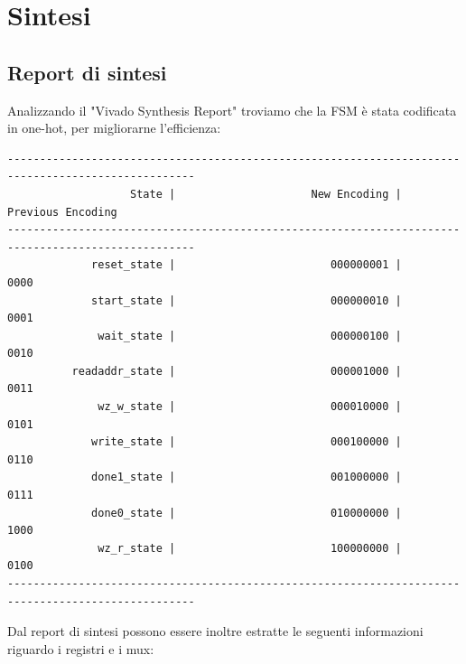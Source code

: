 \documentclass{article}
\begin{document}
\vspace{4mm}
\titlerule[0.4pt]


\pagebreak
\section{Sintesi}
\subsection{Report di sintesi}
Analizzando il "Vivado Synthesis Report" troviamo che la FSM è stata codificata in one-hot, per migliorarne l'efficienza:

\begin{verbatim}
---------------------------------------------------------------------------------------------------
                   State |                     New Encoding |                Previous Encoding 
---------------------------------------------------------------------------------------------------
             reset_state |                        000000001 |                             0000
             start_state |                        000000010 |                             0001
              wait_state |                        000000100 |                             0010
          readaddr_state |                        000001000 |                             0011
              wz_w_state |                        000010000 |                             0101
             write_state |                        000100000 |                             0110
             done1_state |                        001000000 |                             0111
             done0_state |                        010000000 |                             1000
              wz_r_state |                        100000000 |                             0100
---------------------------------------------------------------------------------------------------
\end{verbatim}
\noindent
Dal report di sintesi possono essere inoltre estratte le seguenti informazioni riguardo i registri e i mux:
\end{document}
